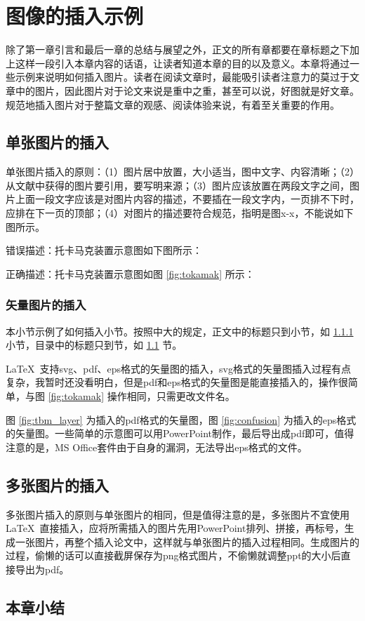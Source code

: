 \chapter{图像的插入示例}
\label{cha:fig_example}
除了第一章引言和最后一章的总结与展望之外，正文的所有章都要在章标题之下加上这样一段引入本章内容的话语，让读者知道本章的目的以及意义。本章将通过一些示例来说明如何插入图片。读者在阅读文章时，最能吸引读者注意力的莫过于文章中的图片，因此图片对于论文来说是重中之重，甚至可以说，好图就是好文章。规范地插入图片对于整篇文章的观感、阅读体验来说，有着至关重要的作用。
\section{单张图片的插入}
\label{sec:fig_singlefig}
单张图片插入的原则：（1）图片居中放置，大小适当，图中文字、内容清晰；（2）从文献中获得的图片要引用，要写明来源；（3）图片应该放置在两段文字之间，图片上面一段文字应该是对图片内容的描述，不要插在一段文字内，一页排不下时，应排在下一页的顶部；（4）对图片的描述要符合规范，指明是图x-x，不能说如下图所示。

错误描述：托卡马克装置示意图如下图所示\cite{xu2016general}：

正确描述：托卡马克装置示意图如图 \ref{fig:tokamak} 所示\cite{xu2016general}：

\subsection{矢量图片的插入}
\label{ssec:fig_vecfig}
本小节示例了如何插入小节。按照中大的规定，正文中的标题只到小节，如 \ref{ssec:fig_vecfig} 小节，目录中的标题只到节，如 \ref{sec:fig_singlefig} 节。

\LaTeX\  支持svg、pdf、eps格式的矢量图的插入，svg格式的矢量图插入过程有点复杂，我暂时还没看明白，但是pdf和eps格式的矢量图是能直接插入的，操作很简单，与图 \ref{fig:tokamak} 操作相同，只需更改文件名。

图 \ref{fig:tbm_layer} 为插入的pdf格式的矢量图，图 \ref{fig:confusion} 为插入的eps格式的矢量图。一些简单的示意图可以用PowerPoint制作，最后导出成pdf即可，值得注意的是，MS Office套件由于自身的漏洞，无法导出eps格式的文件。


\section{多张图片的插入}
\label{sec:fig_multifig}
多张图片插入的原则与单张图片的相同，但是值得注意的是，多张图片不宜使用\LaTeX\ 直接插入，应将所需插入的图片先用PowerPoint排列、拼接，再标号，生成一张图片，再整个插入论文中，这样就与单张图片的插入过程相同。生成图片的过程，偷懒的话可以直接截屏保存为png格式图片，不偷懒就调整ppt的大小后直接导出为pdf。



\section{本章小结}

